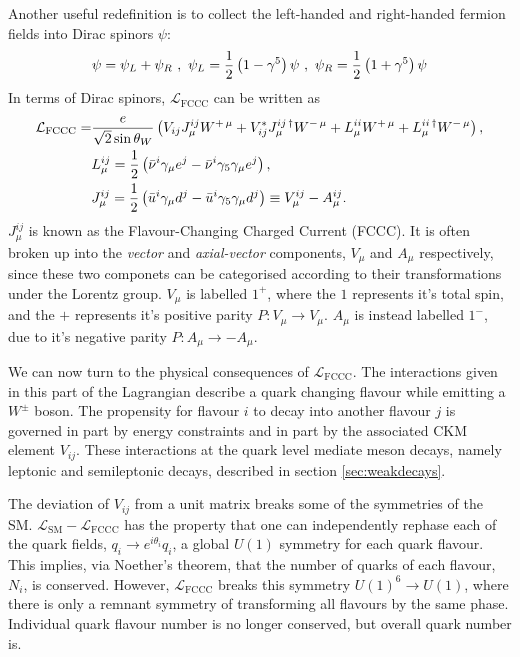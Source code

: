 Another useful redefinition is to collect the left-handed and right-handed fermion fields into Dirac spinors $\psi$:
\begin{align}
  \psi = \psi_L + \psi_R \,\,,\,\, \psi_L = {1\over 2}\left(1-\gamma^5 \right) \psi \,\,,\,\, \psi_R = {1\over 2}\left(1+\gamma^5\right) \psi
\end{align}
In terms of Dirac spinors, $\mathcal{L}_{\text{FCCC}}$ can be written as
\begin{align}
  \mathcal{L}_{\text{FCCC}} =& {e \over \sqrt{2} \sin \theta_W} \left( V_{ij} J^{ij}_{\mu} W^{+\,\mu} + V^*_{ij} J^{ij\,\dagger}_{\mu} W^{-\,\mu} +
  L^{ii}_{\mu} W^{+\,\mu} + L^{ii\,\dagger}_{\mu} W^{-\,\mu}
  \right), \\
  &L^{ij}_{\mu} = {1\over2}\left(\bar{\nu}^i \gamma_{\mu} e^j - \bar{\nu}^i \gamma_5 \gamma_{\mu} e^j\right), \\
  &J^{ij}_{\mu} = {1\over2}\left(\bar{u}^i \gamma_{\mu} d^j - \bar{u}^i \gamma_5 \gamma_{\mu} d^j\right) \equiv V^{ij}_{\mu} - A^{ij}_{\mu}.
\end{align}
$J^{ij}_{\mu}$ is known as the Flavour-Changing Charged Current (FCCC). It is often broken up into the {\it{vector}} and {\it{axial-vector}} components, $V_{\mu}$ and $A_{\mu}$ respectively, since these two componets can be categorised according to their transformations under the Lorentz group. $V_{\mu}$ is labelled $1^+$, where the $1$ represents it's total spin, and the $+$ represents it's positive parity $P: V_{\mu} \to V_{\mu}$. $A_{\mu}$ is instead labelled $1^-$, due to it's negative parity $P: A_{\mu} \to - A_{\mu}$.

We can now turn to the physical consequences of $\mathcal{L}_{\text{FCCC}}$. The interactions given in this part of the Lagrangian describe a quark changing flavour while emitting a $W^{\pm}$ boson. The propensity for flavour $i$ to decay into another flavour $j$ is governed in part by energy constraints and in part by the associated CKM element $V_{ij}$. These
interactions at the quark level mediate meson decays, namely leptonic and semileptonic decays, described in section \ref{sec:weakdecays}.

The deviation of $V_{ij}$ from a unit matrix breaks some of the symmetries of the SM. $\mathcal{L}_{\text{SM}}-\mathcal{L}_{\text{FCCC}}$ has the property that one can independently rephase each of the quark fields, $q_i\to e^{i\theta_i}q_i$, a global $U(1)$ symmetry for each quark flavour. This implies, via Noether's theorem, that the number of quarks of each flavour, $N_i$, is conserved. However, $\mathcal{L}_{\text{FCCC}}$ breaks this symmetry $U(1)^6\to U(1)$, where there is only a remnant symmetry of transforming all flavours by the same phase. Individual quark flavour number is no longer conserved, but overall quark number is.

